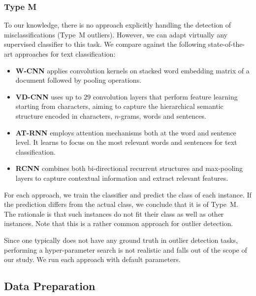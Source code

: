 \subsubsection{Type M} To our knowledge, there is no approach explicitly handling the detection of misclassifications (Type~M outliers). However, we can adapt virtually any supervised classifier to this task. We compare against the following state-of-the-art approaches for text classification:%

\begin{itemize}[leftmargin=*, noitemsep]
    \item \textbf{\gls{W-CNN}}   applies convolution kernels on stacked word embedding matrix of a document followed by pooling operations. 
    \item \textbf{\gls{VD-CNN}} uses up to $29$ convolution layers that perform feature learning starting from characters, aiming to capture the hierarchical semantic structure encoded in characters, $n$-grams, words and sentences.
    \item \textbf{\gls{AT-RNN}}  employs attention mechanisms both at the word and sentence level. It learns to focus on the most relevant words and sentences for text classification. 
    \item \textbf{\gls{RCNN}}  combines both bi-directional recurrent structures and max-pooling layers to capture contextual information and extract relevant features.
\end{itemize}

For each approach, we train the classifier and predict the class of each instance. If the prediction differs from the actual class, we conclude that it is of Type~M. The rationale is that such instances do not fit their class as well as other instances. Note that this is a rather common approach for outlier detection.

Since one typically does not have any ground truth in outlier detection tasks, performing a hyper-parameter search is not realistic and falls out of the scope of our study. We run each approach with default parameters. 

\subsection{Data Preparation}

